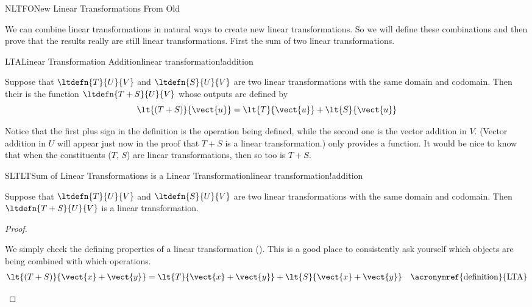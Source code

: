 \begin{subsect}{NLTFO}{New Linear Transformations From Old}
%
\begin{para}We can combine linear transformations in natural ways to create new linear transformations.  So we will define these combinations and then prove that the results really are still linear transformations.  First the sum of two linear transformations.\end{para}
%
\begin{definition}{LTA}{Linear Transformation Addition}{linear transformation!addition}
\begin{para}Suppose that $\ltdefn{T}{U}{V}$ and $\ltdefn{S}{U}{V}$ are two linear transformations with the same domain and codomain.  Then their  is the function $\ltdefn{T+S}{U}{V}$ whose outputs are defined by
%
\begin{equation*}
\lt{(T+S)}{\vect{u}}=\lt{T}{\vect{u}}+\lt{S}{\vect{u}}
\end{equation*}
\end{para}
%
\end{definition}
%
\begin{para}Notice that the first plus sign in the definition is the operation being defined, while the second one is the vector addition in $V$.  (Vector addition in $U$ will appear just now in the proof that $T+S$ is a linear transformation.)   only provides a function.  It would be nice to know that when the constituents ($T$, $S$) are linear transformations, then so too is $T+S$.\end{para}
%
\begin{theorem}{SLTLT}{Sum of Linear Transformations is a Linear Transformation}{linear transformation!addition}
\begin{para}Suppose that $\ltdefn{T}{U}{V}$ and $\ltdefn{S}{U}{V}$ are two linear transformations with the same domain and codomain.  Then $\ltdefn{T+S}{U}{V}$ is a linear transformation.\end{para}
\end{theorem}
%
\begin{proof}
\begin{para}We simply check the defining properties of a linear transformation ().  This is a good place to consistently ask yourself which objects are being combined with which operations.
%
\begin{align*}
\lt{(T+S)}{\vect{x}+\vect{y}}&=
\lt{T}{\vect{x}+\vect{y}}+\lt{S}{\vect{x}+\vect{y}}&&\text{\acronymref{definition}{LTA}}\\

\end{align*}
\end{para}
\end{proof}
\end{subsect}
